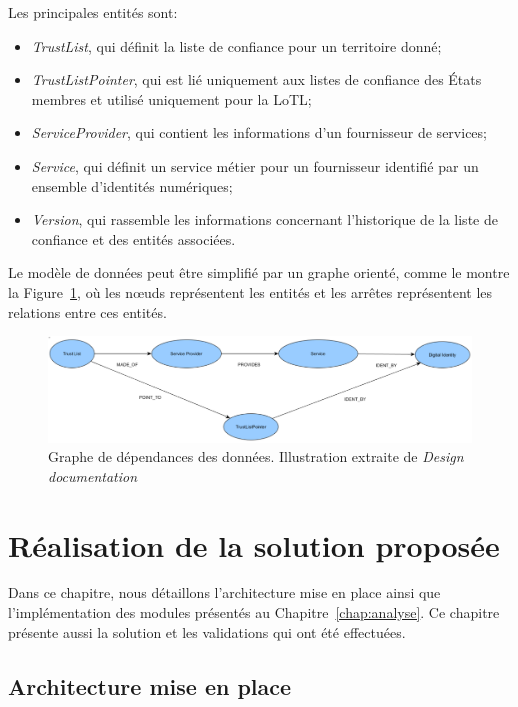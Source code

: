 \documentclass{tnreport}
\begin{document}
Les principales entités sont:
\begin{itemize}
	\item \textit{TrustList}, qui définit la liste de confiance pour un territoire donné;
	\item \textit{TrustListPointer}, qui est lié uniquement aux listes de confiance des États membres et utilisé uniquement pour la LoTL;
	\item \textit{ServiceProvider}, qui contient les informations d'un fournisseur de services;
	\item \textit{Service}, qui définit un service métier pour un fournisseur identifié par un ensemble d'identités numériques;
	\item \textit{Version}, qui rassemble les informations concernant l'historique de la liste de confiance et des entités associées.
\end{itemize}
\clearpage

Le modèle de données peut être simplifié par un graphe orienté, comme le montre la Figure~\ref{fig:dependencies}, où les nœuds représentent les entités et les arrêtes représentent les relations entre ces entités.

\begin{figure}[h]
	\centering
	\includegraphics[scale=0.42]{figures/dependencies}
	\caption{Graphe de dépendances des données. Illustration extraite de \textit{Design documentation}~\cite{design-document}}
	\label{fig:dependencies}
\end{figure}

\chapter{Réalisation de la solution proposée}
\label{chap:realisation}

Dans ce chapitre, nous détaillons l'architecture mise en place ainsi que l'implémentation des modules présentés au Chapitre~\ref{chap:analyse}. Ce chapitre présente aussi la solution et les validations qui ont été effectuées.

\section{Architecture mise en place}
\label{sec:architecture}
\end{document}
